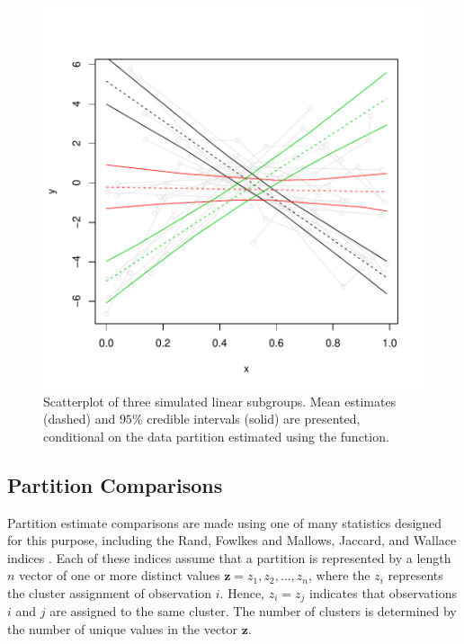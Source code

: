 \documentclass[article, nojss]{jss}
\newcommand{\bz}{\boldsymbol{z}}
\begin{document}
\begin{figure}[h!]
\begin{center}
\includegraphics{profdpm-004}
\end{center}
\caption{Scatterplot of three simulated linear subgroups. Mean estimates (dashed) and $95\%$ credible intervals (solid) are presented, conditional on the data partition estimated using the  function. \label{fig:sim1}}
\end{figure}

\subsection[Comparison]{Partition Comparisons}

Partition estimate comparisons are made using one of many statistics designed for this purpose, including the Rand, Fowlkes and Mallows, Jaccard, and Wallace indices \citep{Rand1971,FowlkesMallows1983,Wallace1983}. Each of these indices assume that a partition is represented by a length $n$ vector of one or more distinct values $\bz = {z_1, z_2, \ldots, z_n}$, where the $z_i$ represents the cluster assignment of observation $i$. Hence, $z_i = z_j$ indicates that observations $i$ and $j$ are assigned to the same cluster. The number of clusters is determined by the number of unique values in the vector $\bz$.
\end{document}
